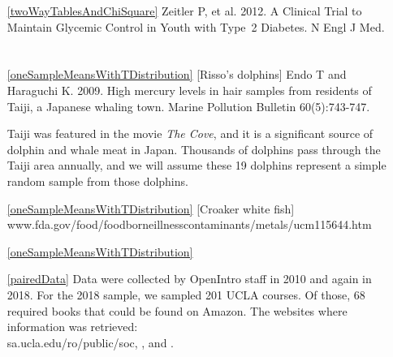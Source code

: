 \begin{itemize}
\item[\ref{twoWayTablesAndChiSquare}]
    Zeitler P, et al. 2012.
    A Clinical Trial to Maintain Glycemic Control in Youth
    with Type~2 Diabetes.
    N Engl J Med.

\end{itemize}






\section{}
\label{ch_inference_for_means_data}

\begin{itemize}
\item[\ref{oneSampleMeansWithTDistribution}]
    [Risso's dolphins]
    Endo T and Haraguchi K. 2009.
    High mercury levels in hair samples from residents of Taiji,
    a Japanese whaling town.
    Marine Pollution Bulletin 60(5):743-747.

    Taiji was featured in the movie
    \emph{The Cove}, and it is a significant source of dolphin
    and whale meat in Japan.
    Thousands of dolphins pass through the Taiji area annually,
    and we will assume these 19 dolphins represent a simple
    random sample from those dolphins.
\item[\ref{oneSampleMeansWithTDistribution}]
    [Croaker white fish]
        {www.fda.gov/food/foodborneillnesscontaminants/metals/ucm115644.htm}
\item[\ref{oneSampleMeansWithTDistribution}]

\item[\ref{pairedData}]
    Data were collected by OpenIntro staff in 2010 and again
    in 2018.
    For the 2018 sample, we sampled 201 UCLA courses.
    Of those, 68 required books that could be
    found on Amazon.
    The websites where information was retrieved: \\
        {sa.ucla.edu/ro/public/soc},
    ,
    and .


\end{itemize}
